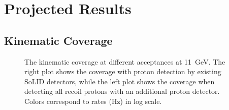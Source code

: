\section{Projected Results}

\subsection{Kinematic Coverage}

\begin{figure}[!ht]
 \begin{center}
 \caption[The kinematic coverage at different acceptances.]{\footnotesize{The
     kinematic coverage at different acceptances at 11~GeV. The right plot
     shows the coverage with proton detection by existing SoLID
     detectors, while the left plot
     shows the coverage when detecting all recoil protons with an additional proton detector. Colors correspond to rates (Hz) in log scale.}}
  \label{kin_cor}
  \end{center}
\end{figure}

